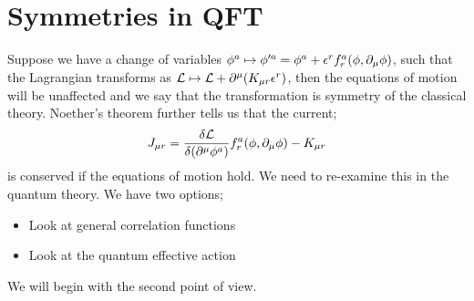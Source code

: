 \section{Symmetries in QFT}
Suppose we have a change of variables $\phi^a \mapsto \phi^{\prime a} = \phi^a + \epsilon^{r}f^{a}_r(\phi, \partial_\mu \phi)$, such that the Lagrangian transforms as $\mathcal{L} \mapsto \mathcal{L} + \partial^\mu(K_{\mu r} \epsilon^r)$, then the equations of motion will be unaffected and we say that the transformation is symmetry of the classical theory. Noether's theorem further tells us that the current;
\begin{equation*}
J_{\mu r} = \frac{\delta \mathcal{L}}{\delta(\partial^\mu \phi^a)}f_r^a(\phi, \partial_\mu \phi) - K_{\mu r}
\end{equation*}
is conserved if the equations of motion hold. We need to re-examine this in the quantum theory. We have two options;
\begin{itemize}
\item Look at general correlation functions
\item Look at the quantum effective action
\end{itemize}
We will begin with the second point of view.

